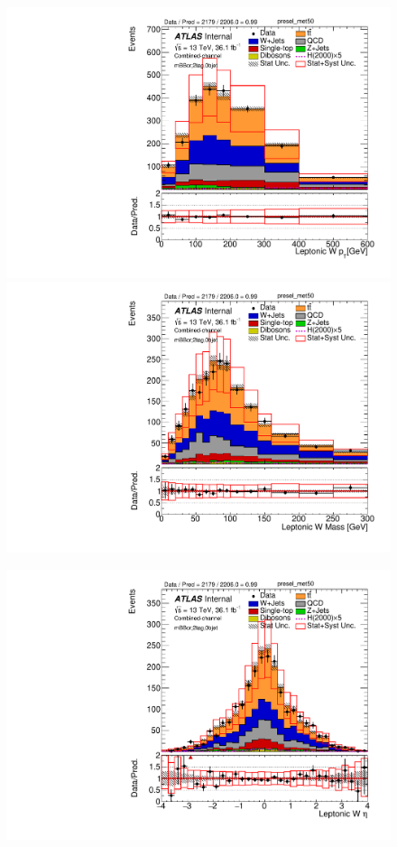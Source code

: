 \begin{figure}[!h]
\begin{center}
\includegraphics[scale=0.33]{./figures/boosted/PlotsInMbbCR/DataMC_2tag_0bjet_mbbcr_lepton_presel_met50_WlepPt}
\includegraphics[scale=0.33]{./figures/boosted/PlotsInMbbCR/DataMC_2tag_0bjet_mbbcr_lepton_presel_met50_WlepMass} \\
\par\medskip
\includegraphics[scale=0.33]{./figures/boosted/PlotsInMbbCR/DataMC_2tag_0bjet_mbbcr_lepton_presel_met50_WlepEta}

\end{center}
\end{figure}

